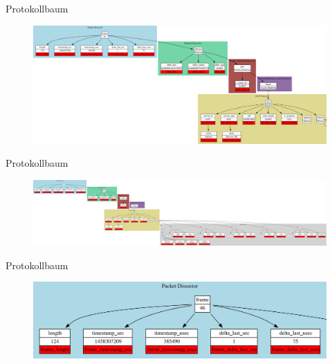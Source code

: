 \begin{frame}{Protokollbaum}
	\begin{figure}
		\centering
		\includegraphics[width=\textwidth]{./images/packet_path/proto_tree/5.png}
	\end{figure}
\end{frame}
\begin{frame}{Protokollbaum}
	\begin{figure}
		\centering
		\includegraphics[width=\textwidth]{./images/packet_path/proto_tree/6.png}
	\end{figure}
\end{frame}

\begin{frame}{Protokollbaum}
	\begin{figure}
		\centering
		\includegraphics[width=\textwidth]{./images/packet_path/proto_tree/1.png}
	\end{figure}
\end{frame}

